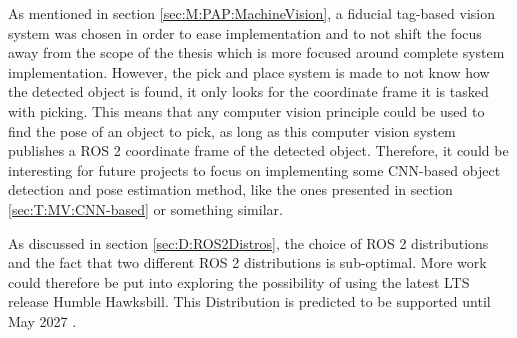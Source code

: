 As mentioned in section \ref{sec:M:PAP:MachineVision}, a fiducial tag-based vision system was chosen in order to ease implementation and to not shift the focus away from the scope of the thesis which is more focused around complete system implementation. However, the pick and place system is made to not know how the detected object is found, it only looks for the coordinate frame it is tasked with picking. This means that any computer vision principle could be used to find the pose of an object to pick, as long as this computer vision system publishes a ROS 2 coordinate frame of the detected object. Therefore, it could be interesting for future projects to focus on implementing some CNN-based object detection and pose estimation method, like the ones presented in section \ref{sec:T:MV:CNN-based} or something similar.

As discussed in section \ref{sec:D:ROS2Distros}, the choice of ROS 2 distributions and the fact that two different ROS 2 distributions is sub-optimal. More work could therefore be put into exploring the possibility of using the latest LTS release Humble Hawksbill. This Distribution is predicted to be supported until May 2027 \cite{ROS2distros}.

